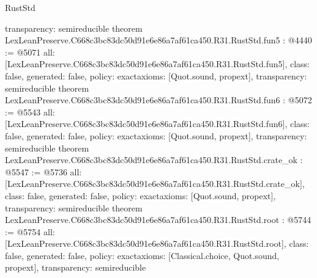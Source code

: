 \begin{lexlean}{RustStd}
\begin{coremodule}
{  transparency: semireducible
}
theorem LexLeanPreserve.C668c3bc83dc50d91e6e86a7af61ca450.R31.RustStd.fun5 : @4440 := @5071 {
  all: [LexLeanPreserve.C668c3bc83dc50d91e6e86a7af61ca450.R31.RustStd.fun5],
  class: false,
  generated: false,
  policy: exact{axioms: [Quot.sound, propext]},
  transparency: semireducible
}
theorem LexLeanPreserve.C668c3bc83dc50d91e6e86a7af61ca450.R31.RustStd.fun6 : @5072 := @5543 {
  all: [LexLeanPreserve.C668c3bc83dc50d91e6e86a7af61ca450.R31.RustStd.fun6],
  class: false,
  generated: false,
  policy: exact{axioms: [Quot.sound, propext]},
  transparency: semireducible
}
theorem LexLeanPreserve.C668c3bc83dc50d91e6e86a7af61ca450.R31.RustStd.crate_ok : @5547 := @5736 {
  all: [LexLeanPreserve.C668c3bc83dc50d91e6e86a7af61ca450.R31.RustStd.crate_ok],
  class: false,
  generated: false,
  policy: exact{axioms: [Quot.sound, propext]},
  transparency: semireducible
}
theorem LexLeanPreserve.C668c3bc83dc50d91e6e86a7af61ca450.R31.RustStd.root : @5744 := @5754 {
  all: [LexLeanPreserve.C668c3bc83dc50d91e6e86a7af61ca450.R31.RustStd.root],
  class: false,
  generated: false,
  policy: exact{axioms: [Classical.choice, Quot.sound, propext]},
  transparency: semireducible
}


\end{coremodule}
\end{lexlean}
